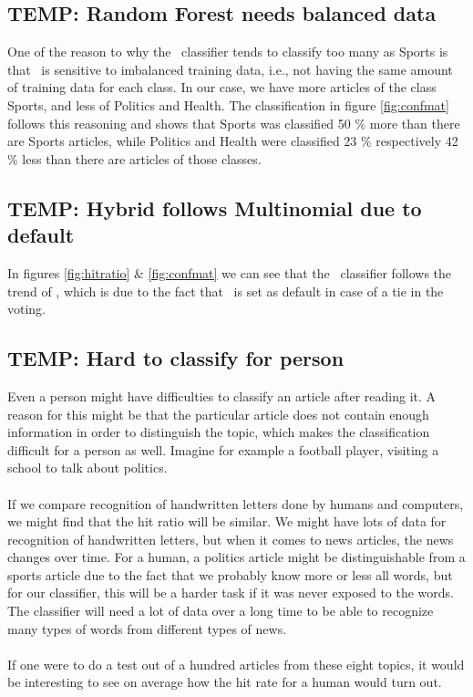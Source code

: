 \subsection{TEMP: Random Forest needs balanced data} %
\label{sub:temp_random_forest_needs_balanced_data}
One of the reason to why the \rf\ classifier tends to classify too many as Sports is that \rf\ is sensitive to imbalanced training data, i.e., not having the same amount of training data for each class. In our case, we have more articles of the class Sports, and less of Politics and Health. The classification in figure \ref{fig:confmat} follows this reasoning and shows that Sports was classified 50 \% more than there are Sports articles, while Politics and Health were classified 23 \% respectively 42 \% less than there are articles of those classes.

\subsection{TEMP: Hybrid follows Multinomial due to default} %
\label{sub:temp_hybrid_follows_multinomial_due_to_default}
In figures \ref{fig:hitratio} \& \ref{fig:confmat} we can see that the \hy\ classifier follows the trend of \mn, which is due to the fact that \mn\ is set as default in case of a tie in the voting.

\subsection{TEMP: Hard to classify for person} %
\label{sub:temp_hard_to_classify_for_person}
Even a person might have difficulties to classify an article after reading it. A reason for this might be that the particular article does not contain enough information in order to distinguish the topic, which makes the classification difficult for a person as well. Imagine for example a football player, visiting a school to talk about politics.
\\\\
If we compare recognition of handwritten letters done by humans and computers, we might find that the hit ratio will be similar. We might have lots of data for recognition of handwritten letters, but when it comes to news articles, the news changes over time. For a human, a politics article might be distinguishable from a sports article due to the fact that we probably know more or less all words, but for our classifier, this will be a harder task if it was never exposed to the words. The classifier will need a lot of data over a long time to be able to recognize many types of words from different types of news.
\\\\
If one were to do a test out of a hundred articles from these eight topics, it would be interesting to see on average how the hit rate for a human would turn out.

